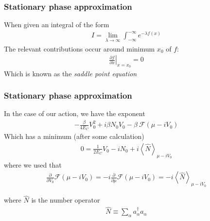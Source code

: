 \documentclass[]{beamer}
\begin{document}
\begin{frame}[t]\frametitle{Stationary phase approximation}
  When given an integral of the form
  \begin{align*}
    I = \lim_{\lambda \to \infty} \int_{-\infty}^{-\infty} e^{-\lambda f(x)}
  \end{align*}
  The relevant contributions occur around minimum $x_0$ of $f$:
  \begin{align*}
    \left.\frac{\partial f}{\partial x} \right\rvert_{x = x_0} = 0
  \end{align*}
  Which is known as the \emph{saddle point equation}
\end{frame}

\begin{frame}[t]\frametitle{Stationary phase approximation}
  In the case of our action, we have the exponent
  \begin{align*}
    -\frac{\beta}{4 E_C} V_0^2 + i \beta N_0 V_0 - \beta ~ \mathcal{F}(\mu - i V_0)
  \end{align*}
  Which has a minimum (after some calculation)
  \begin{align*}
    0 = \frac{1}{2 E_C} V_0 - i N_0 + i \left<\hat{N}\right>_{\mu - i V_0}
  \end{align*}
  where we used that
  \begin{align*}
    \frac{\partial}{\partial V_0} \mathcal{F}(\mu - i V_0) = - i \frac{\partial}{\partial \mu} \mathcal{F}(\mu - i V_0) = - i \left<\hat{N}\right>_{\mu - i V_0}
  \end{align*}

  where $\hat{N}$ is the number operator
  \begin{align*}
    \hat{N} \equiv \sum_{\alpha} a_{\alpha}^{\dagger} a_{\alpha}
  \end{align*}


\end{frame}
\end{document}

